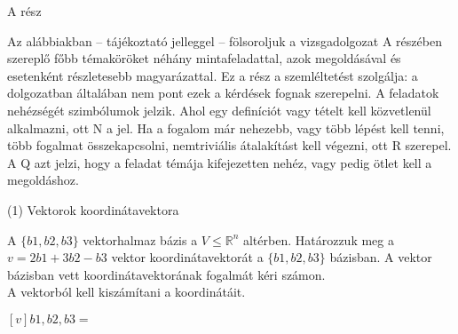 

\begin{frame}[plain]
\begin{tcolorbox}[center, colback={myyellow}, coltext={black}, colframe={myyellow}]
    {\RHuge  A rész}
    \mmedskip
\end{tcolorbox}
\end{frame}

\begin{frame}
  \begin{tcolorbox}[title={2. (4p)}]
Az alábbiakban – tájékoztató jelleggel – fölsoroljuk a vizsgadolgozat A részében szereplő főbb témaköröket néhány mintafeladattal, azok megoldásával és esetenként részletesebb magyarázattal. Ez a rész a szemléltetést szolgálja: a dolgozatban általában nem pont ezek a kérdések fognak szerepelni. A feladatok nehézségét szimbólumok jelzik. Ahol egy definíciót vagy tételt kell közvetlenül alkalmazni, ott N a jel. Ha a fogalom már nehezebb, vagy több lépést kell tenni, több fogalmat összekapcsolni, nemtriviális átalakítást kell végezni, ott R szerepel. A Q azt jelzi, hogy a feladat témája kifejezetten nehéz, vagy pedig ötlet kell a megoldáshoz.
  \end{tcolorbox}
\end{frame}

\begin{frame}[plain]
\begin{tcolorbox}[center, colback={myyellow}, coltext={black}, colframe={myyellow}]
    {\RHuge  (1) Vektorok koordinátavektora}
    \mmedskip
\end{tcolorbox}
\end{frame}

\begin{frame}
  \begin{tcolorbox}[title={1/1. -N-}]
      A $\{b1,b2,b3\}$ vektorhalmaz bázis a $V \leq \mathbb{R}^n$ altérben. Határozzuk meg a $v = 2b1 + 3b2 -b3$ vektor koordinátavektorát a $\{b1,b2,b3\}$ bázisban.
  \tcblower
    A vektor bázisban vett koordinátavektorának fogalmát kéri számon.\\
    
    A vektorból kell kiszámítani a koordinátáit.\\
    \mmedskip 
  
   $[v]b1,b2,b3 =$ 
  \end{tcolorbox}
\end{frame}

